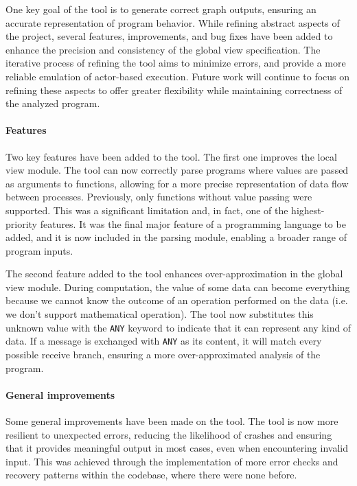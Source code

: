 One key goal of the tool is to generate correct graph outputs, ensuring an  
accurate representation of program behavior. While refining abstract aspects  
of the project, several features, improvements, and bug fixes have been added  
to enhance the precision and consistency of the global view specification. The  
iterative process of refining the tool aims to minimize errors, and provide a
more reliable emulation of  actor-based execution. Future work will continue to
focus on refining these aspects to offer greater 
flexibility while maintaining correctness of the analyzed program.

\paragraph{Features}
Two key features have been added to the tool. The first one improves the local  
view module. The tool can now correctly parse programs where values are passed   
as arguments to functions, allowing for a more precise representation of  
data flow between processes. 
Previously, only functions without value passing were supported. This was a
significant limitation and, in fact, one of the highest-priority features.
It was the final major feature of a programming language to be added, and it is 
now included in the parsing module, enabling a broader range of program inputs.

The second feature added to the tool enhances over-approximation
in the global view module. During computation, the value of 
some data can become everything because we cannot know the outcome of an 
operation performed on the data (i.e. we don't support mathematical operation). 
The tool now substitutes this unknown value with the \texttt{ANY} keyword to 
indicate that it can represent any kind of data. If a message is exchanged with 
\texttt{ANY} as its content, it will match every possible receive branch,
ensuring a more over-approximated analysis of the program.

\paragraph{General improvements}
Some general improvements have been made on the tool. 
The tool is now more resilient to unexpected errors, reducing the  
likelihood of crashes and ensuring that it provides meaningful output in  
most cases, even when encountering invalid input. This was achieved through the
implementation of more error checks and recovery patterns within the codebase, 
where there were none before.

